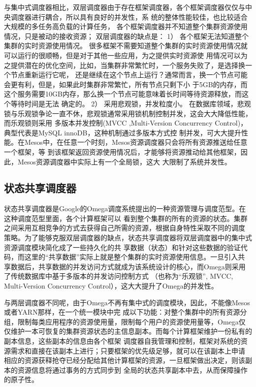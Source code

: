 与集中式调度器相比，双层调度器由于存在框架调度器，各个框架调度器仅仅与中央调度器进行耦合，所以具有良好的并发性，系
统的整体性能较佳，也比较适合大规模的多任务高负载的计算任务，
各个框架调度器并不知道整个集群资源使用情况，只是被动的接收资源；
双层调度器的缺点是：
1）  各个框架无法知道整个集群的实时资源使用情况。
很多框架不需要知道整个集群的实时资源使用情况就可以运行的很顺畅，但是对于其他一些应用，为之提供实时资源使
用情况可以为之提供潜在的优化空间，比如，当集群非常繁忙时，一个服务失败了，是选择换一个节点重新运行它呢，
还是继续在这个节点上运行？通常而言，换一个节点可能会更有利，但是，如果此时集群非常繁忙，所有节点只剩下小
于5GB的内存，而这个服务需要10GB内存，那么换一个节点可能意味着长时间等待资源释放，而这个等待时间是无法
确定的。
2）  采用悲观锁，并发粒度小。
在数据库领域，悲观锁与乐观锁争论一直不休，悲观锁通常采用锁机制控制并发，这会大大降低性能，而乐观锁则采用
多版本并发控制(MVCC ,Multi-Version Concurrency Control)，典型代表是MySQL innoDB，这种机制通过多版本方式控
制并发，可大大提升性能。在Mesos中，在任意一个时刻，Mesos资源调度器只会将所有资源推送给任意一个框架，等
到该框架返回资源使用情况后，才能够将资源推动给其他框架，因此，Mesos资源调度器中实际上有一个全局锁，这大
大限制了系统并发性。
\subsection{状态共享调度器}
 状态共享调度器是Google的Omega调度系统提出的一种资源管理与调度范型。在这种调度范型里面，各个计算框架可以
 看到整个集群的所有的资源的状态。集群之间采用互相竞争的方式去获得自己所需的资源，根据自身特性采取不同的调度
 策略。为了能够克服双层调度器的缺点，状态共享调度器将双层调度器中的集中式资源调度模块简化成了一些持久化的共
 享数据（状态）和针对这些数据的验证代码，而这里的“共享数据”实际上就是整个集群的实时资源使用信息。一旦引入共
 享数据后，共享数据的并发访问方式就成为该系统设计的核心，而Omega则采用了传统数据库中基于多版本的并发访问控制方式
（也称为“乐观锁”, MVCC, Multi-Version Concurrency Control），这大大提升了Omega的并发性。

与两层调度器不同呢，由于Omega不再有集中式的调度模块，因此，不能像Mesos或者YARN那样，在一个统一模块中完
成以下功能：对整个集群中的所有资源分组，限制每类应用程序的资源使用量，限制每个用户的资源使用量等，Omega仅
仅维护一本可恢复的集群资源状态的主信息副本。而每个计算框架维护一份私有的副本信息，这些副本的信息由各个框架
调度器自我管理和控制，框架对系统的资源需求和直接在该副本上进行；只要框架的优先级足够，就可以在该副本上申请
相应的资源获释抢夺已经分配给其他计算框架的资源，一旦框架做出决定，则该副本的资源信息将通过事务的方式同步到
全局的状态共享副本中去，从而保障操作的原子性。

